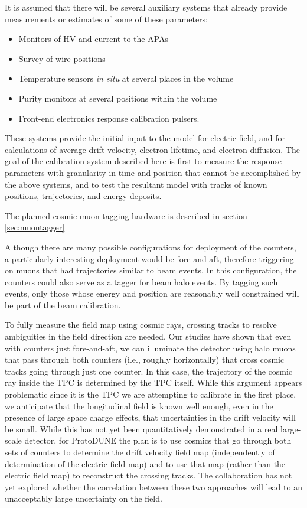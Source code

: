It is assumed that there will be
several auxiliary systems that already provide measurements or estimates of
some of these parameters:
\begin{itemize}
\item Monitors of HV and current to the APAs 
\item Survey of wire positions 
\item Temperature sensors {\it in situ} at several places in the volume
\item Purity monitors at several positions within the volume
\item Front-end electronics response calibration pulsers.
\end{itemize}
        These systems provide the initial input to the model for electric
field, and for calculations of average drift velocity, electron lifetime, and
electron diffusion.  The goal of the calibration system described here 
is first to measure the response parameters with granularity in time and
position that cannot be accomplished by the above systems, and to test the
resultant model with tracks of known positions, trajectories, and energy
deposits.


The planned cosmic muon tagging hardware is described in section \ref{sec:muontagger}

        Although there are many possible configurations for deployment of the
counters, a particularly interesting deployment would be fore-and-aft,
therefore triggering on muons that had trajectories similar to beam events. In
this configuration, the counters could also serve as a tagger for beam halo
events.  By tagging such events, only those whose energy and position are
reasonably well constrained will be part of the beam calibration.

        To fully measure the field map using cosmic rays, crossing
tracks to resolve ambiguities in the field direction are needed.  Our studies have shown
that even with counters just fore-and-aft, we can illuminate the detector
using halo muons that pass through both counters (i.e., roughly horizontally)
that cross cosmic tracks going through just one counter. In this case, the
trajectory of the cosmic ray inside the TPC is determined by the TPC itself.
While this argument appears problematic since it is the TPC we are attempting
to calibrate in the first place, we anticipate that the longitudinal field is
known well enough, even in the presence of large space charge effects, that
uncertainties in the drift velocity will be small.  While this has not yet been
quantitatively demonstrated in a real large-scale detector, for ProtoDUNE the plan 
is to use cosmics that go through both sets of counters to determine the drift
velocity field map (independently of determination of the electric field map)
and to use that map (rather than the electric field map) to reconstruct the
crossing tracks.  The collaboration has not yet explored whether the correlation between
these two approaches will lead to an unacceptably large uncertainty on the
field.

